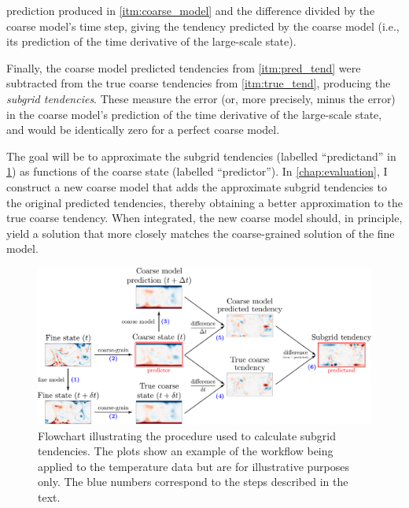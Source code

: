 \documentclass[../main.tex]{subfiles}
\begin{document}
\begin{steps}
        prediction produced in \cref{itm:coarse_model} and the difference
        divided by the coarse model's time step, giving the tendency predicted
        by the coarse model (i.e., its prediction of the time derivative of the
        large-scale state).
    \item\label{itm:subgrid_tend} Finally, the coarse model predicted
        tendencies from \cref{itm:pred_tend} were subtracted from the true
        coarse tendencies from \cref{itm:true_tend}, producing the
        \emph{subgrid tendencies}. These measure the error (or, more precisely,
        minus the error) in the coarse model's prediction of the time
        derivative of the large-scale state, and would be identically zero for
        a perfect coarse model.
\end{steps}

The goal will be to approximate the subgrid tendencies (labelled
``predictand'' in \cref{fig:method}) as functions of the coarse state (labelled
``predictor''). In \cref{chap:evaluation}, I construct a new coarse model
that adds the approximate subgrid tendencies to the original predicted
tendencies, thereby obtaining a better approximation to the true coarse
tendency. When integrated, the new coarse model should, in principle,
yield a solution that more closely matches the coarse-grained solution of
the fine model.

\begin{figure}[ht]
    \centering
    \includegraphics[width=\linewidth]{figures/method_v2.pdf}
    \caption{
        Flowchart illustrating the procedure used to calculate subgrid
        tendencies. The plots show an example of the workflow being applied to
        the temperature data but are for illustrative purposes only. The blue
        numbers correspond to the steps described in the text.
    }
    \label{fig:method}
\end{figure}
\end{document}
